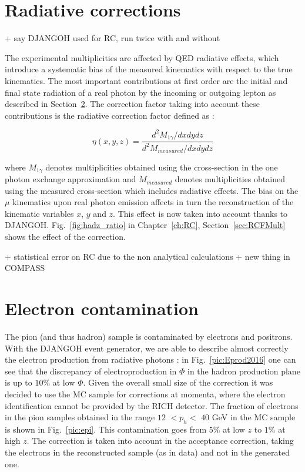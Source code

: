 \section{Radiative corrections} \label{sec:rcf}

+ say DJANGOH used for RC, run twice with and without

The experimental multiplicities are affected by QED radiative effects, which introduce a systematic bias of the measured kinematics with respect to the true kinematics. The most important contributions at first order are the initial and final state radiation of a real photon by the incoming or outgoing lepton as described in Section~\ref{}. The correction factor taking into account these contributions is the radiative correction factor defined as :

\begin{equation}
	\eta(x,y,z) = \frac{d^2 M_{1\gamma}/dxdydz}{d^2 M_{measured}/dxdydz}
\end{equation}

where $M_{1\gamma}$ denotes multiplicities obtained using the cross-section in the one photon exchange approximation and $M_{measured}$ denotes multiplicities obtained using the measured cross-section which includes radiative effects. The bias on the $\mu$ kinematics upon real photon emission affects in turn the reconstruction of the kinematic variables $x$, $y$ and $z$. This effect is now taken into account thanks to DJANGOH. Fig.~\ref{fig:hadz_ratio} in Chapter~\ref{ch:RC}, Section~\ref{sec:RCFMult} shows the effect of the correction.

+ statistical error on RC due to the non analytical calculations
+ new thing in COMPASS

\section{Electron contamination}

The pion (and thus hadron) sample is contaminated by electrons and positrons. With the DJANGOH event generator, we are able to describe almost correctly the electron production from radiative photons : in Fig.~\ref{pic:Eprod2016} one can see that the discrepancy of electroproduction in $\Phi$ in the hadron production plane is up to $10$\% at low $\Phi$. Given the overall small size of the correction it was decided to use the MC sample for corrections at momenta, where the electron identification cannot be provided by the RICH detector. The fraction of electrons in the pion samples obtained in the range $12$ $< p_h <$ $40$ GeV in the MC sample is shown in Fig.~\ref{pic:epi}. This contamination goes from $5$\% at low $z$ to $1$\% at high $z$. The correction is taken into account in the acceptance correction, taking the electrons in the reconstructed sample (as in data) and not in the generated one.

